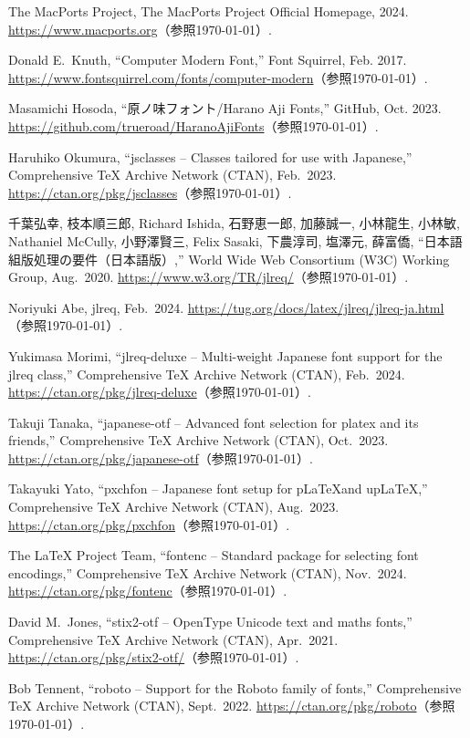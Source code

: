 \begin{thebibliography}{99}
 The MacPorts Project, The MacPorts Project Official Homepage, 2024.
\url{https://www.macports.org}（参照\today）.

Donald E.\ Knuth, ``Computer Modern Font,'' Font Squirrel, Feb. 2017. 
\url{https://www.fontsquirrel.com/fonts/computer-modern}（参照\today）.

Masamichi Hosoda, ``原ノ味フォント/Harano Aji Fonts,'' GitHub, Oct. 2023.
\url{https://github.com/trueroad/HaranoAjiFonts}（参照\today）.

Haruhiko Okumura, ``jsclasses -- Classes tailored for use with Japanese,'' Comprehensive {\TeX} Archive Network (CTAN), Feb.\ 2023.
\url{https://ctan.org/pkg/jsclasses}（参照\today）.

千葉弘幸, 枝本順三郎, Richard Ishida, 石野恵一郎, 加藤誠一, 小林龍生, 小林敏, Nathaniel McCully, 小野澤賢三, Felix Sasaki, 下農淳司, 塩澤元, 薛富僑, ``日本語組版処理の要件（日本語版）,'' World Wide Web Consortium (W3C) Working Group, Aug.\ 2020.
\url{https://www.w3.org/TR/jlreq/}（参照\today）.

Noriyuki Abe, jlreq, Feb.\ 2024.
\url{https://tug.org/docs/latex/jlreq/jlreq-ja.html}（参照\today）.

 Yukimasa Morimi, ``jlreq-deluxe -- Multi-weight Japanese font support for the jlreq class,'' Comprehensive {\TeX} Archive Network (CTAN), Feb.\ 2024.
\url{https://ctan.org/pkg/jlreq-deluxe}（参照\today）.

Takuji Tanaka, ``japanese-otf -- Advanced font selection for platex and its friends,'' Comprehensive {\TeX} Archive Network (CTAN), Oct.\ 2023.
\url{https://ctan.org/pkg/japanese-otf}（参照\today）.

 Takayuki Yato, ``pxchfon – Japanese font setup for p\LaTeX and up\LaTeX,''  Comprehensive {\TeX} Archive Network (CTAN), Aug.\ 2023.
\url{https://ctan.org/pkg/pxchfon}（参照\today）.

The {\LaTeX} Project Team, ``fontenc -- Standard package for selecting font encodings,'' Comprehensive {\TeX} Archive Network (CTAN), Nov.\ 2024.
\url{https://ctan.org/pkg/fontenc}（参照\today）.

David M.\ Jones, ``stix2-otf -- OpenType Unicode text and maths fonts,'' Comprehensive {\TeX} Archive Network (CTAN), Apr.\ 2021.
\url{https://ctan.org/pkg/stix2-otf/}（参照\today）.

 Bob Tennent, ``roboto -- Support for the Roboto family of fonts,'' Comprehensive {\TeX} Archive Network (CTAN), Sept.\ 2022.
\url{https://ctan.org/pkg/roboto}（参照\today）.


\end{thebibliography}
